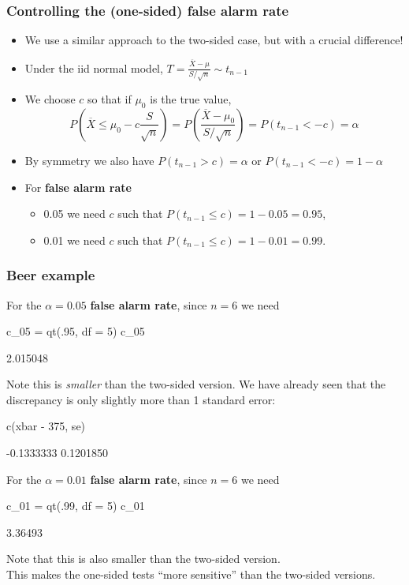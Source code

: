 \documentclass[a4paper]{article}\usepackage[]{graphicx}\usepackage[]{xcolor}
\begin{document}
\subsubsection{Controlling the (one-sided) false alarm rate}
\begin{itemize}
	\item We use a similar approach to the two-sided case, but with a crucial difference!
	\item Under the iid normal model, \( T = \frac{\overline{X} - \mu}{S / \sqrt{n}} \sim t_{n-1} \)
	\item We choose \( c \) so that if \( \mu_0 \) is the true value,
	\[
		P \left( \overline{X} \leq \mu_0 - c \frac{S}{\sqrt{n}} \right) = P \left( \frac{\overline{X} - \mu_0}{S / \sqrt{n}} \right) = P(t_{n-1} < -c) = \alpha
	\]
	\item By symmetry we also have \( P(t_{n-1} > c) = \alpha \) or \( P(t_{n-1} < -c) = 1 -\alpha \) 
	\item For \textcolor{mygreen}{\textbf{false alarm rate}}
	\begin{itemize}
		\item 0.05 we need \( c \) such that \( P(t_{n-1} \leq c) = 1-0.05 = 0.95 \),
		\item 0.01 we need \( c \) such that \( P(t_{n-1} \leq c) = 1-0.01 = 0.99 \).
	\end{itemize}
\end{itemize}
\subsubsection{Beer example}
For the \( \alpha = 0.05 \) \textcolor{mygreen}{\textbf{false alarm rate}}, since \( n = 6 \) we need
\begin{Schunk}
\begin{Sinput}
c_05 = qt(.95, df = 5)
c_05
\end{Sinput}
\begin{Soutput}
[1] 2.015048
\end{Soutput}
\end{Schunk}
Note this is \textit{smaller} than the two-sided version.
We have already seen that the discrepancy is only slightly more than 1 standard error:
\begin{Schunk}
\begin{Sinput}
c(xbar - 375, se)
\end{Sinput}
\begin{Soutput}
[1] -0.1333333  0.1201850
\end{Soutput}
\end{Schunk}
For the \( \alpha = 0.01 \) \textcolor{mygreen}{\textbf{false alarm rate}}, since \( n = 6 \) we need
\begin{Schunk}
\begin{Sinput}
c_01 = qt(.99, df = 5)
c_01
\end{Sinput}
\begin{Soutput}
[1] 3.36493
\end{Soutput}
\end{Schunk}
Note that this is also smaller than the two-sided version.\\
This makes the one-sided tests ``more sensitive'' than the two-sided versions.
\end{document}

